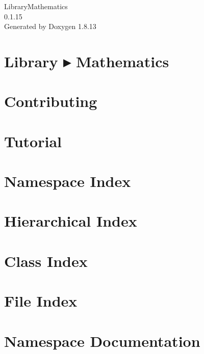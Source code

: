 \documentclass[twoside]{book}
\newcommand{\+}{\discretionary{\mbox{\scriptsize$\hookleftarrow$}}{}{}}
\newcommand{\clearemptydoublepage}{%
  \newpage{\pagestyle{empty}\cleardoublepage}%
}
\begin{document}
\hypersetup{pageanchor=false,
             bookmarksnumbered=true,
             pdfencoding=unicode
            }
\begin{titlepage}
\vspace*{7cm}
\begin{center}%
{\Large Library\+Mathematics \\[1ex]\large 0.\+1.\+15 }\\
\vspace*{1cm}
{\large Generated by Doxygen 1.8.13}\\
\end{center}
\end{titlepage}
\clearemptydoublepage
{}
\tableofcontents
\clearemptydoublepage
{}
\hypersetup{pageanchor=true}

\chapter{Library ▸ Mathematics}
\label{index}\hypertarget{index}{}
\chapter{Contributing}
\label{md__c_o_n_t_r_i_b_u_t_i_n_g}

\chapter{Tutorial}
\label{md_docs__tutorial}

\chapter{Namespace Index}

\chapter{Hierarchical Index}

\chapter{Class Index}

\chapter{File Index}

\chapter{Namespace Documentation}










\end{document}
